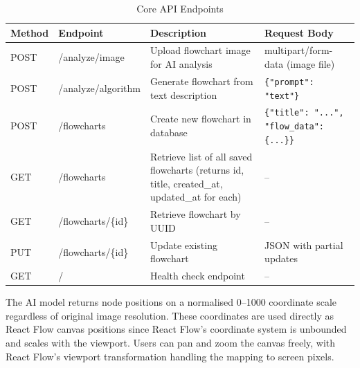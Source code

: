 \begin{table}[htbp]
    \footnotesize
    \centering
    \renewcommand{\arraystretch}{1.1}
    \begin{tabular}{|>{\raggedright\arraybackslash}p{1.5cm}|>{\raggedright\arraybackslash}p{3cm}|>{\raggedright\arraybackslash}p{4cm}|>{\raggedright\arraybackslash}p{3cm}|}
        \hline
        \textbf{Method} & \textbf{Endpoint}  & \textbf{Description} & \textbf{Request Body} \\
        \hline

        POST & /analyze/image & Upload flowchart image for AI analysis
        & multipart/form-data (image file) \\
        \hline

        POST & /analyze/algorithm & Generate flowchart from text description
        & \texttt{\{"prompt": "text"\}} \\
        \hline

        POST & /flowcharts & Create new flowchart in database
        & \texttt{\{"title": "...", "flow\_data": \{...\}\}} \\
        \hline

        GET & /flowcharts & Retrieve list of all saved flowcharts (returns id, title, created\_at, updated\_at for each)
        & -- \\
        \hline

        GET & /flowcharts/\{id\} & Retrieve flowchart by UUID
        & -- \\
        \hline

        PUT & /flowcharts/\{id\} & Update existing flowchart
        & JSON with partial updates \\
        \hline

        GET & / & Health check endpoint
        & -- \\
        \hline

    \end{tabular}
    \caption{Core API Endpoints}
    \label{tab:api-endpoints}
\end{table}

\justifying

The AI model returns node positions on a normalised 0--1000 coordinate scale regardless of original image resolution. These coordinates are used directly as React Flow canvas positions since React Flow's coordinate system is unbounded and scales with the viewport. Users can pan and zoom the canvas freely, with React Flow's viewport transformation handling the mapping to screen pixels.

